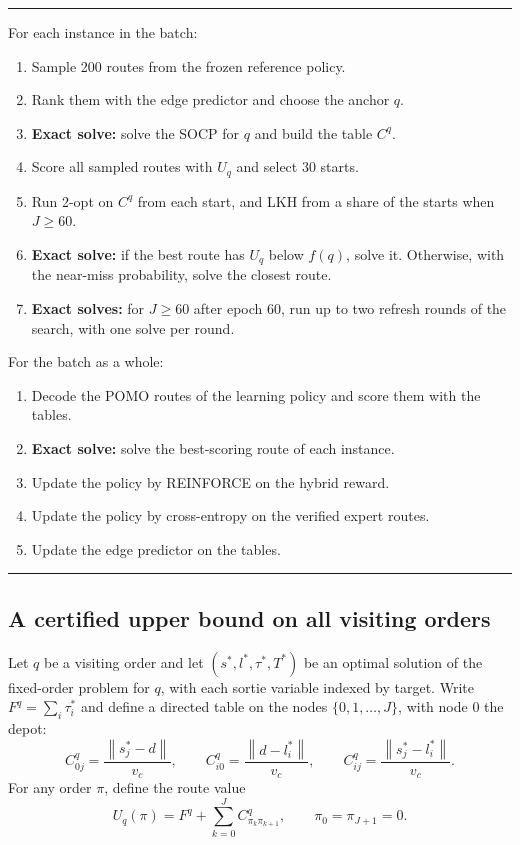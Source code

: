 \documentclass[preprint,12pt,authoryear]{elsarticle}
\newcommand{\norm}[1]{\left\lVert #1 \right\rVert}
\begin{document}
\begin{table}[t]
\caption{One training step for a batch of instances. Exact solves are marked.}
\label{alg:train}
\small
\hrule\smallskip
\noindent For each instance in the batch:
\begin{enumerate}
\setlength{\itemsep}{0pt}
\item Sample 200 routes from the frozen reference policy.
\item Rank them with the edge predictor and choose the anchor $q$.
\item \textbf{Exact solve:} solve the SOCP for $q$ and build the table $C^{q}$.
\item Score all sampled routes with $U_{q}$ and select 30 starts.
\item Run 2-opt on $C^{q}$ from each start, and LKH from a share of the starts when $J \ge 60$.
\item \textbf{Exact solve:} if the best route has $U_{q}$ below $f(q)$, solve it. Otherwise, with the near-miss probability, solve the closest route.
\item \textbf{Exact solves:} for $J \ge 60$ after epoch 60, run up to two refresh rounds of the search, with one solve per round.
\end{enumerate}
\noindent For the batch as a whole:
\begin{enumerate}
\setlength{\itemsep}{0pt}
\setcounter{enumi}{7}
\item Decode the POMO routes of the learning policy and score them with the tables.
\item \textbf{Exact solve:} solve the best-scoring route of each instance.
\item Update the policy by REINFORCE on the hybrid reward.
\item Update the policy by cross-entropy on the verified expert routes.
\item Update the edge predictor on the tables.
\end{enumerate}
\hrule
\end{table}

\subsection{A certified upper bound on all visiting orders}
\label{sec:bound}

Let $q$ be a visiting order and let $(s^{*},l^{*},\tau^{*},T^{*})$ be an optimal solution of the fixed-order problem for $q$, with each sortie variable indexed by target. Write $F^{q} = \sum_{i} \tau^{*}_{i}$ and define a directed table on the nodes $\{0,1,\dots,J\}$, with node $0$ the depot:
\begin{equation}
C^{q}_{0j} = \frac{\norm{s^{*}_{j} - d}}{v_{c}}, \qquad
C^{q}_{i0} = \frac{\norm{d - l^{*}_{i}}}{v_{c}}, \qquad
C^{q}_{ij} = \frac{\norm{s^{*}_{j} - l^{*}_{i}}}{v_{c}} .
\end{equation}
For any order $\pi$, define the route value
\begin{equation}
U_{q}(\pi) = F^{q} + \sum_{k=0}^{J} C^{q}_{\pi_{k}\pi_{k+1}}, \qquad \pi_{0} = \pi_{J+1} = 0 .
\end{equation}
\end{document}
